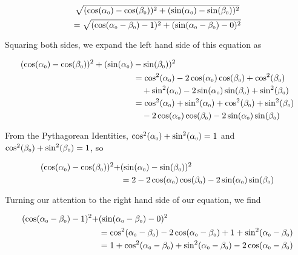 \begin{multline*}
\sqrt{(\cos(\alpha_{\mbox{\tiny $0$}}) - \cos(\beta_{\mbox{\tiny $0$}}))^2 + (\sin(\alpha_{\mbox{\tiny $0$}}) - \sin(\beta_{\mbox{\tiny $0$}}))^2 }\\
=\sqrt{(\cos(\alpha_{\mbox{\tiny $0$}} - \beta_{\mbox{\tiny $0$}}) - 1)^2 + (\sin(\alpha_{\mbox{\tiny $0$}} - \beta_{\mbox{\tiny $0$}}) - 0)^2}
\end{multline*}

Squaring both sides, we expand the left hand side of this equation as

\begin{align*}
(\cos(\alpha_{\mbox{\tiny $0$}}) - \cos(\beta_{\mbox{\tiny $0$}}))^2 + (\sin(\alpha_{\mbox{\tiny $0$}})& - \sin(\beta_{\mbox{\tiny $0$}}))^2 \\
& = \cos^2(\alpha_{\mbox{\tiny $0$}}) - 2\cos(\alpha_{\mbox{\tiny $0$}})\cos(\beta_{\mbox{\tiny $0$}}) + \cos^2(\beta_{\mbox{\tiny $0$}}) \\  
& \quad + \sin^2(\alpha_{\mbox{\tiny $0$}}) - 2\sin(\alpha_{\mbox{\tiny $0$}})\sin(\beta_{\mbox{\tiny $0$}})  +  \sin^2(\beta_{\mbox{\tiny $0$}}) \\ 
& =  \cos^2(\alpha_{\mbox{\tiny $0$}}) + \sin^2(\alpha_{\mbox{\tiny $0$}}) + \cos^2(\beta_{\mbox{\tiny $0$}}) + \sin^2(\beta_{\mbox{\tiny $0$}}) \\
& \quad -  2\cos(\alpha_{\mbox{\tiny $0$}})\cos(\beta_{\mbox{\tiny $0$}}) - 2\sin(\alpha_{\mbox{\tiny $0$}})\sin(\beta_{\mbox{\tiny $0$}})
\end{align*}

From the Pythagorean Identities, $\cos^2(\alpha_{\mbox{\tiny $0$}}) + \sin^2(\alpha_{\mbox{\tiny $0$}}) = 1$ and $\cos^2(\beta_{\mbox{\tiny $0$}}) + \sin^2(\beta_{\mbox{\tiny $0$}}) = 1$, so

\begin{align*}
(\cos(\alpha_{\mbox{\tiny $0$}}) - \cos(\beta_{\mbox{\tiny $0$}}))^2 +& (\sin(\alpha_{\mbox{\tiny $0$}}) - \sin(\beta_{\mbox{\tiny $0$}}))^2 \\
& = 2  - 2\cos(\alpha_{\mbox{\tiny $0$}})\cos(\beta_{\mbox{\tiny $0$}}) - 2\sin(\alpha_{\mbox{\tiny $0$}})\sin(\beta_{\mbox{\tiny $0$}})
\end{align*}

Turning our attention to the right hand side of our equation, we find

\begin{align*}
(\cos(\alpha_{\mbox{\tiny $0$}} - \beta_{\mbox{\tiny $0$}}) - 1)^2 + & (\sin(\alpha_{\mbox{\tiny $0$}} - \beta_{\mbox{\tiny $0$}}) - 0)^2 \\
& =  \cos^2(\alpha_{\mbox{\tiny $0$}} - \beta_{\mbox{\tiny $0$}}) - 2\cos(\alpha_{\mbox{\tiny $0$}} - \beta_{\mbox{\tiny $0$}}) + 1 + \sin^2(\alpha_{\mbox{\tiny $0$}} - \beta_{\mbox{\tiny $0$}}) \\ 
& =  1 +  \cos^2(\alpha_{\mbox{\tiny $0$}} - \beta_{\mbox{\tiny $0$}}) + \sin^2(\alpha_{\mbox{\tiny $0$}} - \beta_{\mbox{\tiny $0$}}) - 2\cos(\alpha_{\mbox{\tiny $0$}} - \beta_{\mbox{\tiny $0$}}) 
\end{align*}

